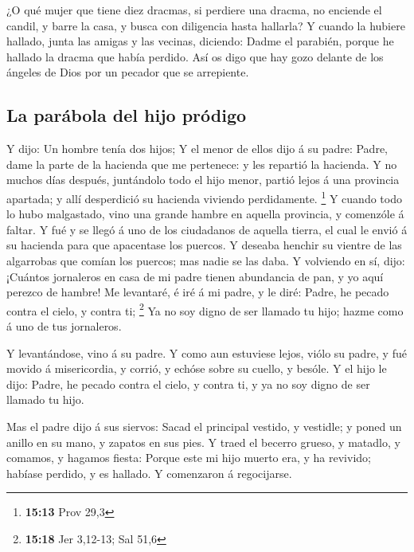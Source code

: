  ¿O qué mujer que tiene diez dracmas, si perdiere una
dracma, no enciende el candil, y barre la casa, y busca con diligencia
hasta hallarla?  Y cuando la hubiere hallado, junta las
amigas y las vecinas, diciendo: Dadme el parabién, porque he hallado la
dracma que había perdido.  Así os digo que hay gozo delante
de los ángeles de Dios por un pecador que se arrepiente.

\hypertarget{la-paruxe1bola-del-hijo-pruxf3digo}{%
\subsection{La parábola del hijo
pródigo}\label{la-paruxe1bola-del-hijo-pruxf3digo}}

 Y dijo: Un hombre tenía dos hijos;  Y el
menor de ellos dijo á su padre: Padre, dame la parte de la hacienda que
me pertenece: y les repartió la hacienda.  Y no muchos días
después, juntándolo todo el hijo menor, partió lejos á una provincia
apartada; y allí desperdició su hacienda viviendo perdidamente.
\footnote{\textbf{15:13} Prov 29,3}  Y cuando todo lo hubo
malgastado, vino una grande hambre en aquella provincia, y comenzóle á
faltar.  Y fué y se llegó á uno de los ciudadanos de
aquella tierra, el cual le envió á su hacienda para que apacentase los
puercos.  Y deseaba henchir su vientre de las algarrobas
que comían los puercos; mas nadie se las daba.  Y volviendo
en sí, dijo: ¡Cuántos jornaleros en casa de mi padre tienen abundancia
de pan, y yo aquí perezco de hambre!  Me levantaré, é iré á
mi padre, y le diré: Padre, he pecado contra el cielo, y contra ti;
\footnote{\textbf{15:18} Jer 3,12-13; Sal 51,6}  Ya no soy
digno de ser llamado tu hijo; hazme como á uno de tus jornaleros.

 Y levantándose, vino á su padre. Y como aun estuviese
lejos, viólo su padre, y fué movido á misericordia, y corrió, y echóse
sobre su cuello, y besóle.  Y el hijo le dijo: Padre, he
pecado contra el cielo, y contra ti, y ya no soy digno de ser llamado tu
hijo.

 Mas el padre dijo á sus siervos: Sacad el principal
vestido, y vestidle; y poned un anillo en su mano, y zapatos en sus
pies.  Y traed el becerro grueso, y matadlo, y comamos, y
hagamos fiesta:  Porque este mi hijo muerto era, y ha
revivido; habíase perdido, y es hallado. Y comenzaron á regocijarse.

